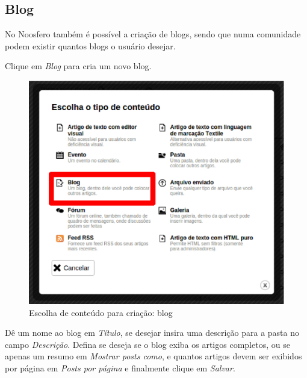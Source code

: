 \newpage
\subsection{Blog}
\label{subsec:blog}

No Noosfero também é possível a criação de blogs, sendo que numa comunidade podem existir quantos blogs o usuário desejar.

Clique em \emph{\color{red}Blog} para cria um novo blog.

\begin{figure}[H]
  \centering
    \includegraphics[keepaspectratio=true,scale=0.49]{figuras/selecionarBlog.eps}
  \caption{Escolha de conteúdo para criação: blog}
  \label{fig:selecionarBlog}
\end{figure}

\newpage
Dê um nome ao blog em \emph{Título}, se desejar insira uma descrição para a pasta no campo \emph{Descrição}. Defina se deseja se o blog exiba os artigos completos, ou se apenas um resumo em \emph{Mostrar posts como}, e quantos artigos devem ser exibidos por página em \emph{Posts por página} e finalmente clique em \emph{\color{red}Salvar}.

